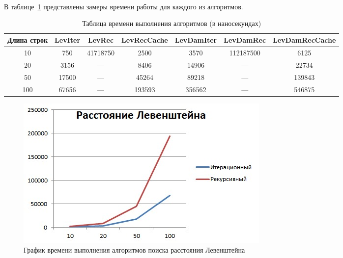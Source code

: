 \documentclass[12pt]{report}
\begin{document}
    В таблице~\ref{tab:times} представлены замеры времени работы для каждого из алгоритмов.

    \begin{table}[H]
        \caption{Таблица времени выполнения алгоритмов (в наносекундах)}
        \label{tab:times}
        \centering
        \begin{tabular}{|c c c c c c c|}
            \hline
            Длина строк & LevIter & LevRec   & LevRecCache & LevDamIter & LevDamRec & LevDamRecCache \\
            \hline
            10          & 750     & 41718750 & 2500        & 3570       & 112187500 & 6125           \\
            \hline
            20          & 3156    & ---      & 8406        & 14906      & ---       & 22734          \\
            \hline
            50          & 17500   & ---      & 45264        & 89218      & ---       & 139843         \\
            \hline
            100         & 67656   & ---      & 193593      & 356562     & ---       & 546875         \\
            \hline
        \end{tabular}
    \end{table}

    \begin{figure}[H]
        \centering
        \includegraphics[scale=0.75]{img/levGraphic}
        \caption{График времени выполнения алгоритмов поиска расстояния Левенштейна}
        \label{fig:levGraphic}
    \end{figure}
\end{document}

